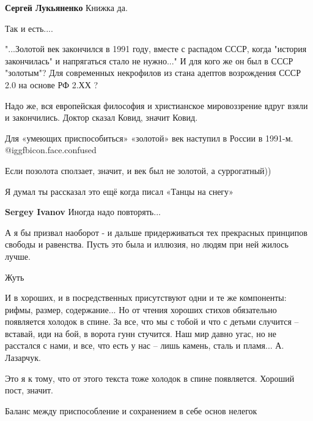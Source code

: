 \begin{itemize}
\begin{itemize}
\textbf{Сергей Лукьяненко} Книжка да.
\end{itemize} %

Так и есть....


"...Золотой век закончился в 1991 году, вместе с распадом СССР, когда "история
закончилась" и напрягаться стало не нужно..." И для кого же он был в СССР
"золотым"? Для современных некрофилов из стана адептов возрождения СССР 2.0 на
основе РФ 2.ХХ ?


Надо же, вся европейская философия и христианское мировоззрение вдруг взяли и
закончились. Доктор сказал Ковид, значит Ковид.

Для «умеющих приспособиться» «золотой» век наступил в России в 1991-м.  @igg{fbicon.face.confused} 

Если позолота сползает, значит, и век был не золотой, а суррогатный))

Я думал ты рассказал это ещё когда писал «Танцы на снегу»

\begin{itemize} %
\textbf{Sergey Ivanov} Иногда надо повторять...
\end{itemize} %


А я бы призвал наоборот - и дальше придерживаться тех прекрасных принципов
свободы и равенства. Пусть это была и иллюзия, но людям при ней жилось лучше.

Жуть


И в хороших, и в посредственных присутствуют одни и те же компоненты: рифмы,
размер, содержание... Но от чтения хороших стихов обязательно появляется холодок
в спине. За все, что мы с тобой и что с детьми случится – вставай, иди на бой,
в ворота гунн стучится. Наш мир давно угас, но не расстался с нами, и все, что
есть у нас – лишь камень, сталь и пламя... А. Лазарчук.

\begin{itemize} %
Это я к тому, что от этого текста тоже холодок в спине появляется. Хороший пост, значит.
\end{itemize} %

Баланс между приспособление и сохранением в себе основ нелегок


\end{itemize}
